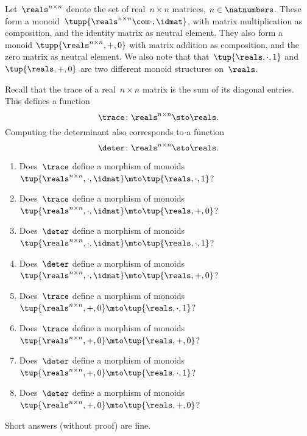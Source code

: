 \begin{gradedexercise}
    \label{ex:TraceAndDeterminant}
    Let~$\reals^{n \times n}$ denote the set of real~$n \times n$ matrices, $n \in \natnumbers$.
    These form a monoid~$\tupp{\reals^{n \times n}\com \cdot, \idmat}$, with matrix multiplication as composition, and the identity matrix as neutral element.
    They also form a monoid $\tupp{\reals^{n \times n}, {{+}}, 0}$ with matrix addition as composition, and the zero matrix as neutral element.
    We also note that that~$\tup{\reals, {{\cdot}}, 1}$ and~$\tup{\reals, {{+}}, 0}$ are two different monoid structures on~$\reals$.

    Recall that the trace of a real~$n \times n$ matrix is the sum of its diagonal entries.
    This defines a function
    \begin{equation}
        \trace \colon \reals^{n \times n} \sto \reals.
    \end{equation}
    Computing the determinant also corresponds to a function
    \begin{equation}
        \deter \colon \reals^{n \times n} \sto \reals.
    \end{equation}

    \begin{enumerate}
        \item Does~$\trace$ define a morphism of monoids~$\tup{\reals^{n \times n}, {{\cdot}},  \idmat} \mto \tup{\reals, {{\cdot}},  1}$?
        \item Does~$\trace$ define a morphism of monoids~$\tup{\reals^{n \times n}, {{\cdot}},  \idmat} \mto \tup{\reals, {{+}},  0}$?
        \item Does~$\deter$ define a morphism of monoids~$\tup{\reals^{n \times n}, {{\cdot}},  \idmat} \mto \tup{\reals, {{\cdot}},  1}$?
        \item Does~$\deter$ define a morphism of monoids~$\tup{\reals^{n \times n}, {{\cdot}},  \idmat} \mto \tup{\reals, {{+}},  0}$?
        \item Does~$\trace$ define a morphism of monoids~$\tup{\reals^{n \times n}, {{+}},  0} \mto \tup{\reals, {{\cdot}},  1}$?
        \item Does~$\trace$ define a morphism of monoids~$\tup{\reals^{n \times n}, {{+}},  0} \mto \tup{\reals, {{+}},  0}$?
        \item Does~$\deter$ define a morphism of monoids~$\tup{\reals^{n \times n}, {{+}},  0} \mto \tup{\reals, {{\cdot}},  1}$?
        \item Does~$\deter$ define a morphism of monoids~$\tup{\reals^{n \times n}, {{+}},  0} \mto \tup{\reals, {{+}},  0}$?
    \end{enumerate}
    Short answers (without proof) are fine.
\end{gradedexercise}

